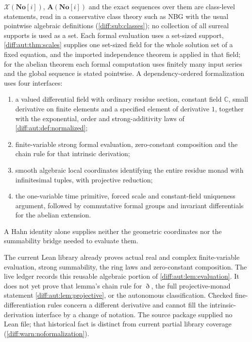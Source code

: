 \documentclass[11pt,letterpaper]{article}
\numberwithin{equation}{section}
\theoremstyle{definition}
\theoremstyle{remark}
\newcommand{\SC}{\mathbf{No}[i]}
\newcommand{\C}{\mathbb C}
\newcommand{\Dn}{\eth}
\begin{document}
\begin{remark}
\label{diff:aut:rem:formalization}
$\mathcal X(\SC)$, $\mathbf A(\SC)$ and the exact sequences over them are
class-level statements, read in a conservative class theory such as NBG with the
usual pointwise algebraic definitions (\cref{diff:sub:classes}); no collection of
all surreal supports is used as a set. Each formal evaluation uses a set-sized
support, \cref{diff:aut:thm:scales} supplies one set-sized field for the whole
solution set of a fixed equation, and the imported independence theorem is
applied in that field; for the abelian theorem each formal computation uses
finitely many input series and the global sequence is stated pointwise.
A dependency-ordered formalization uses four interfaces:
\begin{enumerate}[label=\textup{(\roman*)},leftmargin=2.4em]
\item a valued differential field with ordinary residue section,
constant field $\C$, small derivative on finite elements and a
specified element of derivative $1$, together with the exponential,
order and strong-additivity laws of \cref{diff:aut:def:normalized};
\item finite-variable strong formal evaluation, zero-constant
composition and the chain rule for that intrinsic derivation;
\item smooth algebraic local coordinates identifying the entire
residue monad with infinitesimal tuples, with projective reduction;
\item the one-variable time primitive, forced scale and
constant-field uniqueness argument, followed by commutative formal
groups and invariant differentials for the abelian extension.
\end{enumerate}
A Hahn identity alone supplies neither the geometric coordinates
nor the summability bridge needed to evaluate them.

The current Lean library already proves actual real and complex
finite-variable evaluation, strong summability, the ring laws and
zero-constant composition. The live ledger
 records this reusable algebraic portion
of \cref{diff:aut:lem:evaluation}. It does not yet prove that lemma's
chain rule for $\Dn$, the full projective-monad statement
\cref{diff:aut:lem:projective}, or the autonomous classification.
Checked fine-differentiation rules concern a different derivative
and cannot fill the intrinsic-derivation interface by a change of
notation. The source package supplied no Lean file; that historical
fact is distinct from current partial library coverage
(\cref{diff:warn:noformalization}).
\end{remark}
\end{document}
